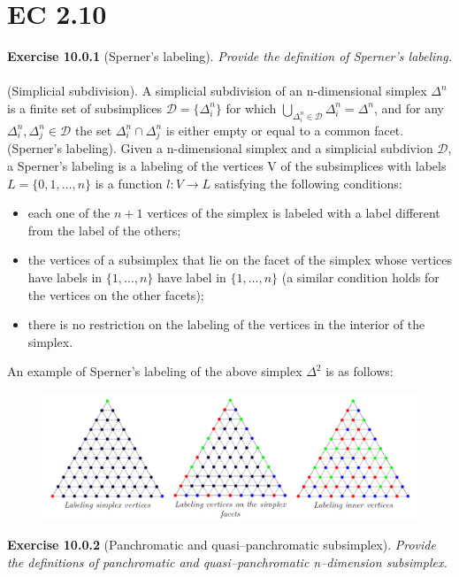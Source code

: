 \section{EC 2.10}

\textbf{Exercise 10.0.1} (Sperner’s labeling). \textit{Provide the definition of Sperner’s labeling.}\\\\
(Simplicial subdivision). A simplicial subdivision of an n-dimensional simplex $\Delta^n$ is a finite set of subsimplices $\mathcal{D} = \{\Delta_i^n\}$ for which $\bigcup_{\Delta_i^n \in \mathcal{D}}{\Delta_i^n} = \Delta^n$, and for any $\Delta_i^n, \Delta_j^n \in \mathcal{D}$ the set $\Delta_i^n \cap \Delta_j^n$ is either empty or equal to a common facet.\\
(Sperner’s labeling). Given a n-dimensional simplex and a simplicial subdivion $ \mathcal{D} $, a Sperner’s labeling is a labeling of the vertices V of the subsimplices with labels $L = \{ 0, 1, \ldots, n \}$ is a function $l : V \rightarrow L$
satisfying the following conditions:
\begin{itemize}
\item each one of the $n+1$ vertices of the simplex is labeled with a label different from the label of the others;
\item the vertices of a subsimplex that lie on the facet of the simplex whose vertices have labels in $\{ 1, \ldots , n \}$ have label in $\{ 1, \ldots , n \}$ (a similar condition holds for the vertices on the other facets);
\item there is no restriction on the labeling of the vertices in the interior of the simplex.
\end{itemize}
An example of Sperner’s labeling of the above simplex $\Delta^2$ is as follows:
\begin{figure}[H]
\centering
\includegraphics[width=\textwidth]{images/img_2_10_01.png}
\end{figure}
\noindent
\textbf{Exercise 10.0.2} (Panchromatic and quasi–panchromatic subsimplex). \textit{Provide the definitions of panchromatic and quasi–panchromatic n–dimension subsimplex.}\\\\

